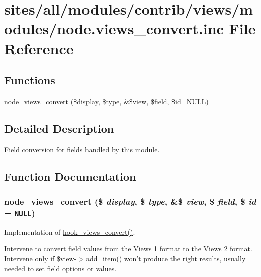 \hypertarget{node_8views__convert_8inc}{
\section{sites/all/modules/contrib/views/modules/node.views\_\-convert.inc File Reference}
\label{node_8views__convert_8inc}
}
\subsection*{Functions}
\begin{CompactItemize}
\item 
\hyperlink{node_8views__convert_8inc_223795a4d3fe7f2cb3e277caece80319}{node\_\-views\_\-convert} (\$display, \$type, \&\$\hyperlink{classview}{view}, \$field, \$id=NULL)
\end{CompactItemize}


\subsection{Detailed Description}
Field conversion for fields handled by this module. 

\subsection{Function Documentation}
\hypertarget{node_8views__convert_8inc_223795a4d3fe7f2cb3e277caece80319}{
\subsubsection[{node\_\-views\_\-convert}]{\setlength{\rightskip}{0pt plus 5cm}node\_\-views\_\-convert (\$ {\em display}, \/  \$ {\em type}, \/  \&\$ {\em view}, \/  \$ {\em field}, \/  \$ {\em id} = {\tt NULL})}}
\label{node_8views__convert_8inc_223795a4d3fe7f2cb3e277caece80319}


Implementation of \hyperlink{group__views__hooks_ge98b0a1c700fe1406af390dfc8c7262e}{hook\_\-views\_\-convert()}.

Intervene to convert field values from the Views 1 format to the Views 2 format. Intervene only if \$view-$>$add\_\-item() won't produce the right results, usually needed to set field options or values. 